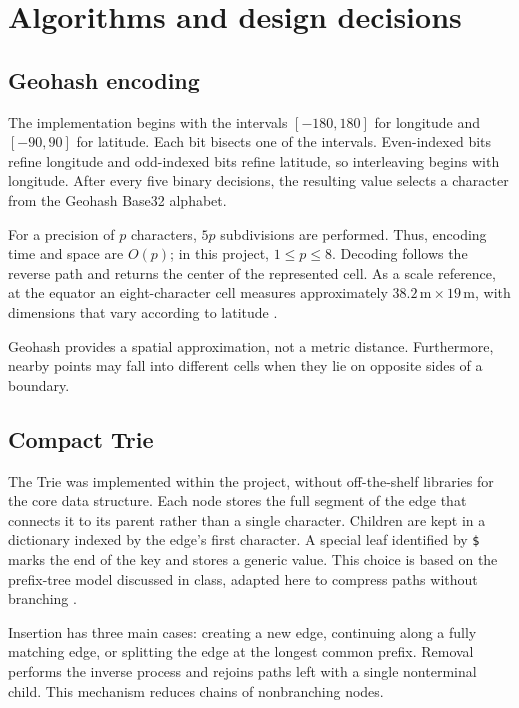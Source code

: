 \documentclass[12pt,a4paper]{article}
\begin{document}
\section{Algorithms and design decisions}

\subsection{Geohash encoding}

The implementation begins with the intervals $[-180,180]$ for longitude and
$[-90,90]$ for latitude. Each bit bisects one of the intervals. Even-indexed
bits refine longitude and odd-indexed bits refine latitude, so interleaving
begins with longitude. After every five binary decisions, the resulting value
selects a character from the Geohash Base32 alphabet.

For a precision of $p$ characters, $5p$ subdivisions are performed. Thus,
encoding time and space are $O(p)$; in this project, $1 \leq p \leq 8$.
Decoding follows the reverse path and returns the center of the represented
cell. As a scale reference, at the equator an eight-character cell measures
approximately $38.2\,\mathrm{m} \times 19\,\mathrm{m}$, with dimensions that
vary according to latitude \cite{elastic-geohash-grid}.

Geohash provides a spatial approximation, not a metric distance. Furthermore,
nearby points may fall into different cells when they lie on opposite sides of
a boundary.

\subsection{Compact Trie}

The Trie was implemented within the project, without off-the-shelf libraries
for the core data structure. Each node stores the full segment of the edge that
connects it to its parent rather than a single character. Children are kept in
a dictionary indexed by the edge's first character. A special leaf identified
by \texttt{\$} marks the end of the key and stores a generic value. This choice
is based on the prefix-tree model discussed in class, adapted here to compress
paths without branching \cite{aula-trie}.

Insertion has three main cases: creating a new edge, continuing along a fully
matching edge, or splitting the edge at the longest common prefix. Removal
performs the inverse process and rejoins paths left with a single nonterminal
child. This mechanism reduces chains of nonbranching nodes.
\end{document}
